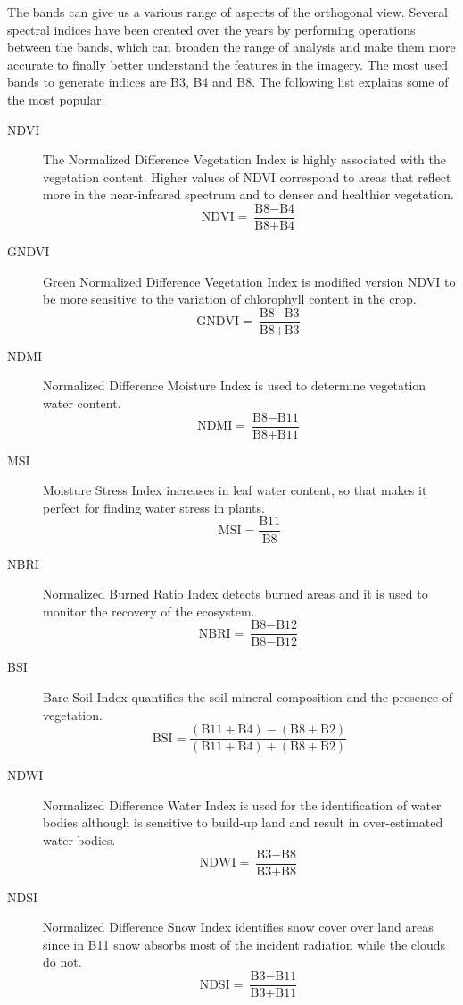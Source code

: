 \documentclass[../main.tex]{subfiles}
\begin{document}
The bands can give us a various range of aspects of the orthogonal view. Several spectral indices have been created over the years by performing operations between the bands, which can broaden the range of analysis and make them more accurate to finally better understand the features in the imagery. The most used bands to generate indices are B3, B4 and B8. The following list explains some of the most popular:
\begin{description}
	\item[NDVI] The Normalized Difference Vegetation Index is highly associated with the vegetation content. Higher values of NDVI correspond to areas that reflect more in the near-infrared spectrum and to denser and healthier vegetation.
	\[\text{NDVI} =  \frac{\text{B8} - \text{B4}}{\text{B8} + \text{B4}}\] 
	\item[GNDVI] Green Normalized Difference Vegetation Index is modified version NDVI to be more sensitive to the variation of chlorophyll content in the crop.
	\[\text{GNDVI} =  \frac{\text{B8} - \text{B3}}{\text{B8} + \text{B3}}\] 
	\item[NDMI] Normalized Difference Moisture Index is used to determine vegetation water content.
	\[\text{NDMI} = \frac{\text{B8} - \text{B11}}{\text{B8} + \text{B11}}\]
	\item[MSI] Moisture Stress Index increases in leaf water content, so that makes it perfect for finding water stress in plants.
	\[\text{MSI} = \frac{\text{B11}}{\text{B8}}\]
	\item[NBRI] Normalized Burned Ratio Index detects burned areas and it is used to monitor the recovery of the ecosystem.
	\[\text{NBRI} = \frac{\text{B8} - \text{B12}}{\text{B8} - \text{B12}}\]
	\item[BSI] Bare Soil Index quantifies the soil mineral composition and the presence of vegetation.
	\[\text{BSI} = \frac{(\text{B11} + \text{B4} )- (\text{B8} + \text{B2})}{(\text{B11} + \text{B4} ) + (\text{B8} + \text{B2})}\]
	\item[NDWI] Normalized Difference Water Index is used for the identification of water bodies although is sensitive to build-up land and result in over-estimated water bodies.
	\[\text{NDWI} = \frac{\text{B3} - \text{B8}}{\text{B3} + \text{B8}}\]
	\item[NDSI] Normalized Difference Snow Index identifies snow cover over land areas since in B11 snow absorbs most of the incident radiation while the clouds do not.
	\[\text{NDSI} = \frac{\text{B3} - \text{B11}}{\text{B3} + \text{B11}}\]
\end{description}
\end{document}
